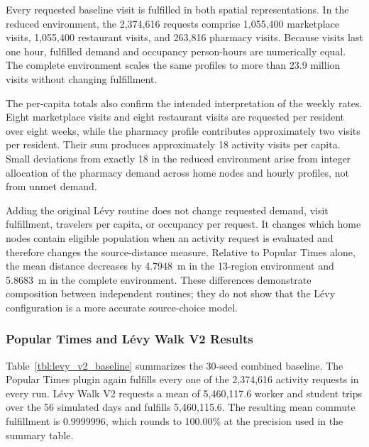 Every requested baseline visit is fulfilled in both spatial representations. In the reduced environment, the 2,374,616 requests comprise 1,055,400 marketplace visits, 1,055,400 restaurant visits, and 263,816 pharmacy visits. Because visits last one hour, fulfilled demand and occupancy person-hours are numerically equal. The complete environment scales the same profiles to more than 23.9 million visits without changing fulfillment.

The per-capita totals also confirm the intended interpretation of the weekly rates. Eight marketplace visits and eight restaurant visits are requested per resident over eight weeks, while the pharmacy profile contributes approximately two visits per resident. Their sum produces approximately 18 activity visits per capita. Small deviations from exactly 18 in the reduced environment arise from integer allocation of the pharmacy demand across home nodes and hourly profiles, not from unmet demand.

Adding the original L\'evy routine does not change requested demand, visit fulfillment, travelers per capita, or occupancy per request. It changes which home nodes contain eligible population when an activity request is evaluated and therefore changes the source-distance measure. Relative to Popular Times alone, the mean distance decreases by 4.7948~m in the 13-region environment and 5.8683~m in the complete environment. These differences demonstrate composition between independent routines; they do not show that the L\'evy configuration is a more accurate source-choice model.

\subsubsection{Popular Times and L\'evy Walk V2 Results}

Table~\ref{tbl:levy_v2_baseline} summarizes the 30-seed combined baseline. The Popular Times plugin again fulfills every one of the 2,374,616 activity requests in every run. L\'evy Walk V2 requests a mean of 5,460,117.6 worker and student trips over the 56 simulated days and fulfills 5,460,115.6. The resulting mean commute fulfillment is 0.9999996, which rounds to 100.00\% at the precision used in the summary table.

